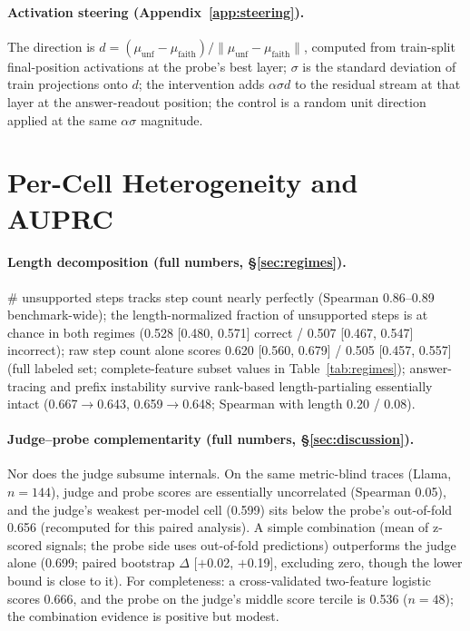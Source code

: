 \documentclass[11pt]{article}
\begin{document}
\paragraph{Activation steering (Appendix~\ref{app:steering}).} The direction is $d = (\mu_{\mathrm{unf}} - \mu_{\mathrm{faith}})/\lVert\mu_{\mathrm{unf}} - \mu_{\mathrm{faith}}\rVert$, computed from train-split final-position activations at the probe's best layer; $\sigma$ is the standard deviation of train projections onto $d$; the intervention adds $\alpha\sigma d$ to the residual stream at that layer at the answer-readout position; the control is a random unit direction applied at the same $\alpha\sigma$ magnitude.

\section{Per-Cell Heterogeneity and AUPRC}
\label{app:forest}

\paragraph{Length decomposition (full numbers, \S\ref{sec:regimes}).} \# unsupported steps tracks step count nearly perfectly (Spearman 0.86--0.89 benchmark-wide); the length-normalized fraction of unsupported steps is at chance in both regimes (0.528 [0.480, 0.571] correct / 0.507 [0.467, 0.547] incorrect); raw step count alone scores 0.620 [0.560, 0.679] / 0.505 [0.457, 0.557] (full labeled set; complete-feature subset values in Table~\ref{tab:regimes}); answer-tracing and prefix instability survive rank-based length-partialing essentially intact (0.667$\to$0.643, 0.659$\to$0.648; Spearman with length 0.20 / 0.08).

\paragraph{Judge--probe complementarity (full numbers, \S\ref{sec:discussion}).} Nor does the judge subsume internals. On the same metric-blind traces (Llama, $n{=}144$), judge and probe scores are essentially uncorrelated (Spearman 0.05), and the judge's weakest per-model cell (0.599) sits below the probe's out-of-fold 0.656 (recomputed for this paired analysis). A simple combination (mean of z-scored signals; the probe side uses out-of-fold predictions) outperforms the judge alone (0.699; paired bootstrap $\Delta$ [$+$0.02, $+$0.19], excluding zero, though the lower bound is close to it). For completeness: a cross-validated two-feature logistic scores 0.666, and the probe on the judge's middle score tercile is 0.536 ($n{=}48$); the combination evidence is positive but modest.
\end{document}
